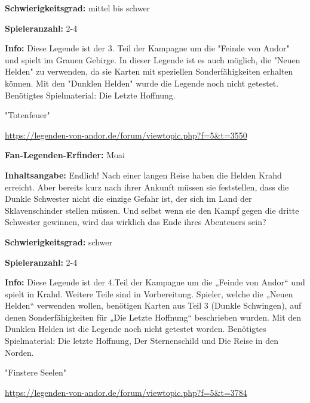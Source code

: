 {\textbf{Schwierigkeitsgrad:} mittel bis schwer

\textbf{Spieleranzahl:} 2-4

\textbf{Info:}
Diese Legende ist der 3. Teil der Kampagne um die "Feinde von Andor" und spielt im Grauen Gebirge. In dieser Legende ist es auch möglich, die "Neuen Helden" zu verwenden, da sie Karten mit speziellen Sonderfähigkeiten erhalten können.
Mit den "Dunklen Helden" wurde die Legende noch nicht getestet.
Benötigtes Spielmaterial: Die Letzte Hoffnung.








\begin{center}
    "Totenfeuer"

    \url{https://legenden-von-andor.de/forum/viewtopic.php?f=5&t=3550}
\end{center}

\textbf{Fan-Legenden-Erfinder:} Moai

\textbf{Inhaltsangabe:}
Endlich! Nach einer langen Reise haben die Helden Krahd erreicht. Aber bereits kurz nach ihrer Ankunft müssen sie feststellen, dass die Dunkle Schwester nicht die einzige Gefahr ist, der sich im Land der Sklavenschinder stellen müssen.
Und selbst wenn sie den Kampf gegen die dritte Schwester gewinnen, wird das wirklich das Ende ihres Abenteuers sein?

\textbf{Schwierigkeitsgrad:} schwer

\textbf{Spieleranzahl:} 2-4

\textbf{Info:}
Diese Legende ist der 4.Teil der Kampagne um die „Feinde von Andor“ und spielt in Krahd. Weitere Teile sind in Vorbereitung. Spieler, welche die „Neuen Helden“ verwenden wollen, benötigen Karten aus Teil 3 (Dunkle Schwingen), auf denen Sonderfähigkeiten für „Die Letzte Hoffnung“ beschrieben wurden. Mit den Dunklen Helden ist die Legende noch nicht getestet worden.
Benötigtes Spielmaterial: Die letzte Hoffnung, Der Sternenschild und Die Reise in den Norden.












\begin{center}
    "Finstere Seelen"

    \url{https://legenden-von-andor.de/forum/viewtopic.php?f=5&t=3784}
\end{center}

}
